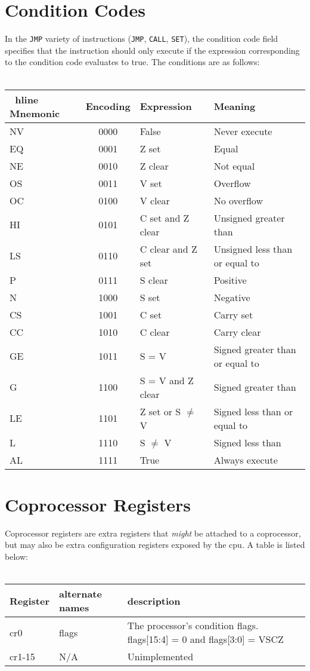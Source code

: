 \documentclass{article}
\begin{document}
        \section{Condition Codes}
        In the \texttt{JMP} variety of instructions (\texttt{JMP}, \texttt{CALL}, \texttt{SET}), the condition code field specifies that the instruction should only execute if the expression corresponding to the condition code evaluates to true. The conditions are as follows: \\ \\
        \begin{tabular}{| l | c | l | l |} \
          hline
        Mnemonic & Encoding & Expression & Meaning \\ \hline
        NV &0000& False & Never execute\\ \hline
        EQ &0001& Z set & Equal\\ \hline
        NE &0010& Z clear & Not equal \\ \hline
        OS &0011& V set & Overflow \\ \hline
        OC &0100& V clear & No overflow \\ \hline
        HI &0101& C set and Z clear & Unsigned greater than \\ \hline
        LS &0110& C clear and Z set & Unsigned less than or equal to \\ \hline
        P  &0111& S clear & Positive \\ \hline
        N  &1000& S set & Negative \\ \hline
        CS &1001& C set & Carry set \\ \hline
        CC &1010& C clear & Carry clear \\ \hline
        GE &1011& S = V & Signed greater than or equal to\\ \hline
        G  &1100& S = V and Z clear & Signed greater than \\ \hline
        LE &1101& Z set or S $\neq$ V & Signed less than or equal to \\ \hline
        L  &1110& S $\neq$ V & Signed less than \\ \hline
        AL &1111& True & Always execute \\ \hline
        \end{tabular}
        \section{Coprocessor Registers}
        Coprocessor registers are extra registers that \textit{might}
        be attached to a coprocessor, but may also be extra
        configuration registers exposed by the cpu. A table is listed below: \\ \\
        \begin{tabular}{|l | l | l|}\hline
          Register & alternate names & description \\ \hline
          cr0 & flags & The processor's condition flags. flags[15:4] = 0 and flags[3:0] = VSCZ \\ \hline
          cr1-15 & N/A & Unimplemented \\ \hline
        \end{tabular}
        \newpage
\end{document}

